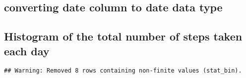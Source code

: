 \documentclass[
]{article}
\newenvironment{Shaded}{\begin{snugshade}}{\end{snugshade}}
\newcommand{\CommentTok}[1]{\textcolor[rgb]{0.56,0.35,0.01}{\textit{#1}}}
\newcommand{\DataTypeTok}[1]{\textcolor[rgb]{0.13,0.29,0.53}{#1}}
\newcommand{\DecValTok}[1]{\textcolor[rgb]{0.00,0.00,0.81}{#1}}
\newcommand{\KeywordTok}[1]{\textcolor[rgb]{0.13,0.29,0.53}{\textbf{#1}}}
\newcommand{\NormalTok}[1]{#1}
\newcommand{\OperatorTok}[1]{\textcolor[rgb]{0.81,0.36,0.00}{\textbf{#1}}}
\newcommand{\OtherTok}[1]{\textcolor[rgb]{0.56,0.35,0.01}{#1}}
\newcommand{\StringTok}[1]{\textcolor[rgb]{0.31,0.60,0.02}{#1}}
\begin{document}
\hypertarget{converting-date-column-to-date-data-type}{%
\subsection{converting date column to date data
type}\label{converting-date-column-to-date-data-type}}

\begin{Shaded}
\end{Shaded}

\hypertarget{histogram-of-the-total-number-of-steps-taken-each-day}{%
\subsection{Histogram of the total number of steps taken each
day}\label{histogram-of-the-total-number-of-steps-taken-each-day}}

\begin{Shaded}
\end{Shaded}

\begin{verbatim}
## Warning: Removed 8 rows containing non-finite values (stat_bin).
\end{verbatim}
\end{document}
